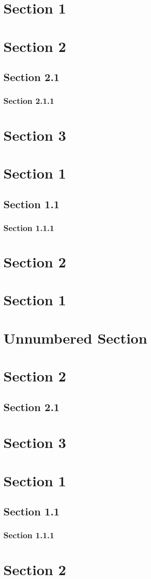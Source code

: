 \section*{Section 1}
\section*{Section 2}
\subsection*{Section 2.1}
\subsubsection*{Section 2.1.1}
\section*{Section 3}

\section*{Section 1}
\subsection*{Section 1.1}
\subsubsection*{Section 1.1.1}
\section*{Section 2}

\section{Section 1}
\section*{Unnumbered Section}
\section{Section 2}
\subsection{Section 2.1}
\section{Section 3}

\section{Section 1}
\subsection{Section 1.1}
\subsubsection{Section 1.1.1}
\section{Section 2}
